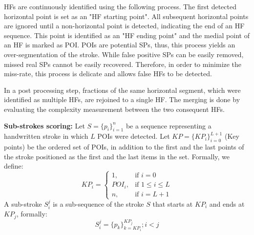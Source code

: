 \documentclass[10pt, conference, compsocconf]{IEEEtran}
\begin{document}
HFs are continuously identified using the following process.
The first detected horizontal point is set as an "HF starting point". 
All subsequent horizontal points are ignored until a non-horizontal point is detected, indicating the end of an HF sequence. 
This point is identified as an "HF ending point" and the medial point of an HF is marked as POI. 
POIs are potential SPs, thus, this process yields an over-segmentation of the stroke. 
While false positive SPs can be easily removed, missed real SPs cannot be easily recovered. 
Therefore, in order to minimize the miss-rate, this process is delicate and allows false HFs to be detected.

In a post processing step, fractions of the same horizontal segment, which were identified as multiple HFs, are rejoined to a single HF. 
The merging is done by evaluating the complexity measurement between the two consequent HFs.


\textbf{Sub-strokes scoring:}
Let $S=\{p_{i}\}_{i=1}^{n}$ be a sequence representing a handwritten stroke in which $L$ POIs were detected. 
Let $KP=\{KP_{i}\}_{i=0}^{L+1}$ (Key points) be the ordered set of POIs, in addition to the first and the last points of the stroke positioned as the first and the last items in the set.
Formally, we define: 
\begin{equation}
KP_{i} =\begin{cases}    1		, & \mbox{if } i=0 \\
							   POI_{i}	, & \mbox{if } 1\leq i \leq L \\
							   n    , & \mbox{if } i=L+1 
			\end{cases}				
\end{equation}
A sub-stroke $S_{i}^{j}$ is a sub-sequence of the stroke $S$ that starts at $KP_{i}$ and ends at $KP_{j}$, formally:
\begin{equation}
S_{i}^{j}=\{p_{k}\}_{k=KP_{i}}^{KP_{j}}; i<j
\label{eq:substroke_definition}
\end{equation}
\end{document}

